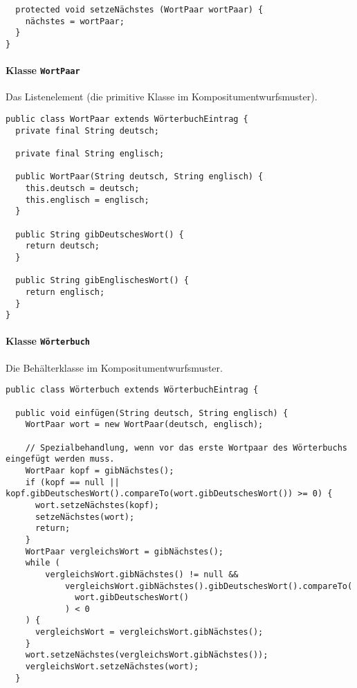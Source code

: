 \documentclass{lehramt-informatik-haupt}
\begin{document}
\begin{itemize}
\begin{verbatim}
  protected void setzeNächstes (WortPaar wortPaar) {
    nächstes = wortPaar;
  }
}
\end{verbatim}

%

\paragraph{Klasse \texttt{WortPaar}}

Das Listenelement (die primitive Klasse im Kompositumentwurfsmuster).

\begin{verbatim}
public class WortPaar extends WörterbuchEintrag {
  private final String deutsch;

  private final String englisch;

  public WortPaar(String deutsch, String englisch) {
    this.deutsch = deutsch;
    this.englisch = englisch;
  }

  public String gibDeutschesWort() {
    return deutsch;
  }

  public String gibEnglischesWort() {
    return englisch;
  }
}
\end{verbatim}

%

\paragraph{Klasse \texttt{Wörterbuch}}

Die Behälterklasse im Kompositumentwurfsmuster.

\begin{verbatim}
public class Wörterbuch extends WörterbuchEintrag {

  public void einfügen(String deutsch, String englisch) {
    WortPaar wort = new WortPaar(deutsch, englisch);

    // Spezialbehandlung, wenn vor das erste Wortpaar des Wörterbuchs eingefügt werden muss.
    WortPaar kopf = gibNächstes();
    if (kopf == null || kopf.gibDeutschesWort().compareTo(wort.gibDeutschesWort()) >= 0) {
      wort.setzeNächstes(kopf);
      setzeNächstes(wort);
      return;
    }
    WortPaar vergleichsWort = gibNächstes();
    while (
        vergleichsWort.gibNächstes() != null &&
            vergleichsWort.gibNächstes().gibDeutschesWort().compareTo(
              wort.gibDeutschesWort()
            ) < 0
    ) {
      vergleichsWort = vergleichsWort.gibNächstes();
    }
    wort.setzeNächstes(vergleichsWort.gibNächstes());
    vergleichsWort.setzeNächstes(wort);
  }


\end{verbatim}
\end{itemize}
\end{document}

